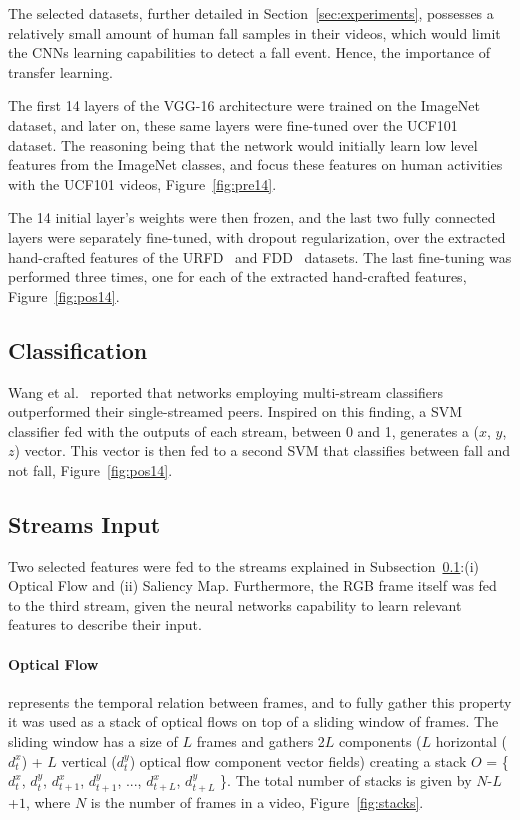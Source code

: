\documentclass[conference]{IEEEtran}
\begin{document}
The selected datasets, further detailed in Section~\ref{sec:experiments}, possesses a relatively small amount of human fall samples in their videos, which would limit the CNNs learning capabilities to detect a fall event. Hence, the importance of transfer learning.

The first 14 layers of the VGG-16 architecture were trained on the ImageNet~\cite{imagenet_cvpr09} dataset, and later on, these same layers were fine-tuned over the UCF101~\cite{soomro2012ucf101} dataset. The reasoning being that the network would initially learn low level features from the ImageNet classes, and focus these features on human activities with the UCF101 videos, Figure~\ref{fig:pre14}.

The 14 initial layer's weights were then frozen, and the last two fully connected layers were separately fine-tuned, with dropout regularization, over the extracted hand-crafted features of the URFD~\cite{kepski2014human} and FDD~\cite{charfi2013optimised} datasets. The last fine-tuning was performed three times, one for each of the extracted hand-crafted features, Figure~\ref{fig:pos14}.

\subsection{Classification}
\label{sec:classification}

Wang et al.~\cite{wang2015towards} reported that networks employing multi-stream classifiers outperformed their single-streamed peers. Inspired on this finding, a SVM classifier fed with the outputs of each stream, between 0 and 1, generates a ($x$, $y$, $z$) vector. This vector is then fed to a second SVM that classifies between fall and not fall, Figure~\ref{fig:pos14}.

\subsection{Streams Input}

Two selected features were fed to the streams explained in Subsection~\ref{sec:classification}:(i) Optical Flow and (ii) Saliency Map. Furthermore, the RGB frame itself was fed to the third stream, given the neural networks capability to learn relevant features to describe their input.

\paragraph{Optical Flow} represents the temporal relation between frames, and to fully gather this property it was used as a stack of optical flows on top of a sliding window of frames. The sliding window has a size of $L$ frames and gathers 2$L$ components ($L$ horizontal ($d_t^x$) + $L$ vertical ($d_t^y$) optical flow component vector fields) creating a stack $O$ = \{$d_t^x$, $d_t^y$, $d_{t+1}^x$, $d_{t+1}^y$, ..., $d_{t+L}^x$, $d_{t+L}^y$ \}. The total number of stacks is given by $N$-$L$+$1$, where $N$ is the number of frames in a video, Figure~\ref{fig:stacks}. 
\end{document}
